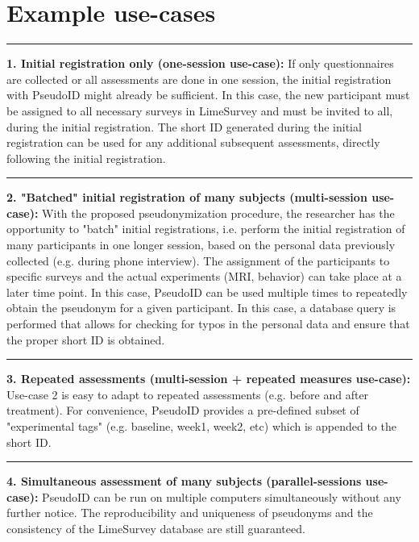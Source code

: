 \section{Example use-cases}
\par\noindent\rule{\textwidth\color{pniblue}}{0.4pt}
\textbf{1. Initial registration only (one-session use-case):}
If only questionnaires are collected or all assessments are done in one session, the initial registration with PseudoID might already be sufficient. In this case, the new participant must be assigned to all necessary surveys in LimeSurvey and must be invited to all, during the initial registration. The short ID generated during the initial registration can be used for any additional subsequent assessments, directly following the initial registration.

\par\noindent\rule{\textwidth\color{pniblue}}{0.4pt}
\textbf{2. "Batched" initial registration of many subjects (multi-session use-case):}
With the proposed pseudonymization procedure, the researcher has the opportunity to "batch" initial registrations, i.e. perform the initial registration of many participants in one longer session, based on the personal data previously collected (e.g. during phone interview). The assignment of the participants to specific surveys and the actual experiments (MRI, behavior) can take place at a later time point. In this case, PseudoID can be used multiple times to repeatedly obtain the pseudonym for a given participant. In this case, a database query is performed that allows for checking for typos in the personal data and ensure that the proper short ID is obtained.

\par\noindent\rule{\textwidth\color{pniblue}}{0.4pt}
\textbf{3. Repeated assessments (multi-session + repeated measures use-case):}
Use-case 2 is easy to adapt to repeated assessments (e.g. before and after treatment).
For convenience, PseudoID provides a pre-defined subset of "experimental tags" (e.g. baseline, week1, week2, etc) which is appended to the short ID.

\par\noindent\rule{\textwidth\color{pniblue}}{0.4pt}
\textbf{4. Simultaneous assessment of many subjects (parallel-sessions use-case):}
PseudoID can be run on multiple computers simultaneously without any further notice. The reproducibility and uniqueness of pseudonyms and the consistency of the LimeSurvey database are still guaranteed.

